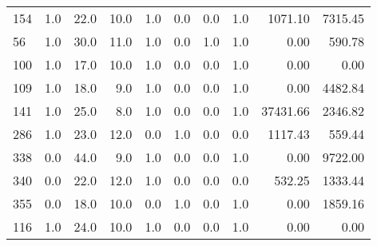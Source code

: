 \begin{table}
{\begin{tabular}{lrrrrrrrrr}
154 &    1.0 &  22.0 &       10.0 &    1.0 &       0.0 &      0.0 &       1.0 &   1071.10 &  7315.45 \\
56  &    1.0 &  30.0 &       11.0 &    1.0 &       0.0 &      1.0 &       1.0 &      0.00 &   590.78 \\
100 &    1.0 &  17.0 &       10.0 &    1.0 &       0.0 &      0.0 &       1.0 &      0.00 &     0.00 \\
109 &    1.0 &  18.0 &        9.0 &    1.0 &       0.0 &      0.0 &       1.0 &      0.00 &  4482.84 \\
141 &    1.0 &  25.0 &        8.0 &    1.0 &       0.0 &      0.0 &       1.0 &  37431.66 &  2346.82 \\
286 &    1.0 &  23.0 &       12.0 &    0.0 &       1.0 &      0.0 &       0.0 &   1117.43 &   559.44 \\
338 &    0.0 &  44.0 &        9.0 &    1.0 &       0.0 &      0.0 &       1.0 &      0.00 &  9722.00 \\
340 &    0.0 &  22.0 &       12.0 &    1.0 &       0.0 &      0.0 &       0.0 &    532.25 &  1333.44 \\
355 &    0.0 &  18.0 &       10.0 &    0.0 &       1.0 &      0.0 &       1.0 &      0.00 &  1859.16 \\
116 &    1.0 &  24.0 &       10.0 &    1.0 &       0.0 &      0.0 &       1.0 &      0.00 &     0.00 \\
\hline
\end{tabular}
}

\end{table}
